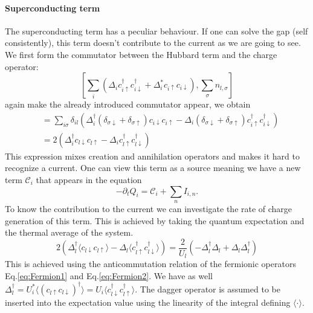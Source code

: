 \documentclass[../main.tex]{subfile}
\begin{document}
\paragraph{Superconducting term} $~$\\
 The superconducting term has a peculiar behaviour. If one can solve the gap (self consistently), this term 
doesn't contribute to the current as we are going to see. We first form the commutator between the Hubbard term and the charge operator:
\begin{equation*}
        \left[\sum_i\left(\Delta_i c_{i\uparrow}^{\dagger}c_{i\downarrow}^{\dagger} + 
        \Delta_i^{\ast} c_{i\uparrow}c_{i\downarrow}\right) , \sum_{\sigma} n_{l,\sigma}\right]
\end{equation*}
again make the already introduced commutator appear, we obtain
\begin{equation*}
    \begin{aligned}
    &= \sum_{i\sigma} \delta_{il}\left(\Delta_i^{\dagger} (\delta_{\sigma\downarrow} + \delta_{\sigma\uparrow})c_{i\downarrow}c_{i\uparrow} 
    -\Delta_i(\delta_{\sigma\downarrow} + \delta_{\sigma\uparrow})c_{i\uparrow}^{\dagger} c_{i\downarrow}^{\dagger}\right)\\
    &= 2 \left( \Delta_i^{\dagger} c_{l\downarrow}c_{l\uparrow} - \Delta_i c_{l\uparrow}^{\dagger}c_{l\downarrow}^{\dagger}\right)
    \end{aligned}
\end{equation*}
This expression mixes creation and annihilation operators and makes it hard to recognize a current. One can view this term as a 
source meaning we have a new term $\mathcal{C}_i$ that appears in the equation  
\[
    -\partial_t Q_i = \mathcal{C}_i +  \sum_n I_{i,n}  .
\]
To know the contribution to the current we can investigate the rate of charge generation of this term. This is achieved by taking the quantum
expectation and the thermal average of the system.
\[
    2 \left( \Delta_l^{\dagger}\langle c_{l\downarrow}c_{l\uparrow}\rangle - \Delta_l \langle c_{l\uparrow}^{\dagger}c_{l\downarrow}^{\dagger}\rangle\right)
    = \frac{2}{U_l}\left(-\Delta_l^{\dagger}\Delta_l + \Delta_l \Delta_l^{\dagger}\right)
\]
This is achieved using the anticommutation relation of the fermionic operators Eq.\ref{eq:Fermion1} and Eq.\ref{eq:Fermion2}. 
We have as well $\Delta_l^{\dagger} = U_i^{\ast} \langle(c_{l\uparrow}c_{l\downarrow})^{\dagger}\rangle = U_i \langle c_{l\downarrow}^{\dagger} c_{l\uparrow}^{\dagger}\rangle$.
The dagger operator is assumed to be inserted into the expectation value using the linearity of the integral defining $\langle \cdot\rangle$.
\end{document}
